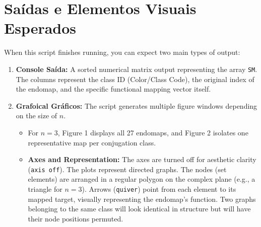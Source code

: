 \section{Saídas e Elementos Visuais Esperados}

When this script finishes running, you can expect two main types of output:
\begin{enumerate}
    \item \textbf{Console Saída:} A sorted numerical matrix output representing the array \texttt{SM}. The columns represent the class ID (Color/Class Code), the original index of the endomap, and the specific functional mapping vector itself.
    \item \textbf{Grafoical Gráficos:} The script generates multiple figure windows depending on the size of $n$. 
    \begin{itemize}
        \item For $n=3$, Figure 1 displays all 27 endomaps, and Figure 2 isolates one representative map per conjugation class. 
        \item \textbf{Axes and Representation:} The axes are turned off for aesthetic clarity (\texttt{axis off}). The plots represent directed graphs. The nodes (set elements) are arranged in a regular polygon on the complex plane (e.g., a triangle for $n=3$). Arrows (\texttt{quiver}) point from each element to its mapped target, visually representing the endomap's function. Two graphs belonging to the same class will look identical in structure but will have their node positions permuted.
    \end{itemize}
\end{enumerate}
